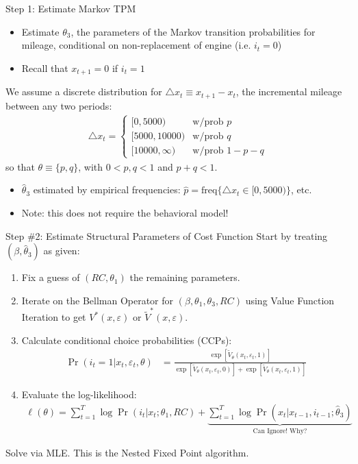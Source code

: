 \documentclass[aspectratio=169,11pt]{beamer}
\begin{document}
\begin{frame}{Step 1: Estimate Markov TPM}
\footnotesize
\begin{itemize}
\item Estimate $\theta_3$, the parameters of the Markov transition probabilities for mileage, conditional on non-replacement of engine (i.e. $i_t = 0$)
\item Recall that $x_{t+1} = 0$ if $i_t = 1$
\end{itemize}

We assume a discrete distribution for $\triangle x_t \equiv x_{t+1} - x_t$, the incremental mileage between any two periods:
\begin{align*}
\triangle x_t = \left \{ 
\begin{matrix}
[0, 5000) & \text{w/prob } p \\
[5000, 10000) & \text{w/prob } q \\
[10000, \infty) & \text{w/prob } 1 - p - q  
\end{matrix}
\right .
\end{align*}
so that $\theta \equiv \{p, q \}$, with $0 < p, q< 1$ and $p + q < 1$. \\
\vspace{2mm}
\begin{itemize}
\item $\hat \theta_3$ estimated by empirical frequencies: $\hat p = \text{freq} \{ \triangle x_t \in  [0, 5000) \}$, etc. 
\item Note: this does not require the behavioral model!
\end{itemize}
\end{frame}

\begin{frame}{Step \#2: Estimate Structural Parameters of Cost Function}
\footnotesize
Start by treating $(\beta, \hat \theta_3)$ as given:
\begin{enumerate}
\item Fix a guess of $(RC,\theta_1)$ the remaining parameters. 
\item Iterate on the Bellman Operator for $(\beta,\theta_1,\theta_3,RC)$ using \alert{Value Function Iteration} to get $V^*(x,\varepsilon)$ or $\tilde V^*(x,\varepsilon)$.
\item Calculate \alert{conditional choice probabilities} (CCPs):
\begin{align*}
\Pr(i_t=1 | x_t,\varepsilon_t,\theta) &=  \frac {\exp[ \tilde V_{\theta} (x_t, \varepsilon_t, 1)]  }{\exp[\tilde  V_{\theta} (x_t, \varepsilon_t, 0)] + \exp[ \tilde  V_{\theta} (x_t, \varepsilon_t, 1)]} 
\end{align*} 
\item Evaluate the log-likelihood:
\begin{align*}
\ell(\theta) = \sum^T_{t=1} \log \Pr (i_t | x_t ; \theta_1,RC) + \underbrace{\sum^T_{t=1} \log \Pr (x_t | x_{t-1}, i_{t-1}; \hat{\theta}_3)}_{\text{Can Ignore! Why?}}
\end{align*}
\end{enumerate}
Solve via MLE. This is the \alert{Nested Fixed Point} algorithm.
\end{frame}
\end{document}
